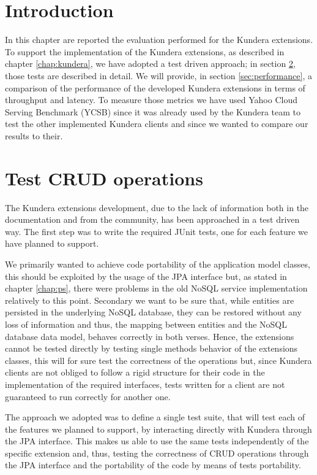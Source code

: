 \section{Introduction}
In this chapter are reported the evaluation performed for the Kundera extensions.
To support the implementation of the Kundera extensions, as described in chapter \ref{chap:kundera}, we have adopted a test driven approach; in section \ref{sec:crud}, those tests are described in detail.
\noindent We will provide, in section \ref{sec:performance}, a comparison of the performance of the developed Kundera extensions in terms of throughput and latency. To measure those metrics we have used Yahoo Cloud Serving Benchmark (YCSB) \cite{paper:ycsb} since it was already used by the Kundera team to test the other implemented Kundera clients and since we wanted to compare our results to their.

\section{Test CRUD operations}
\label{sec:crud}
The Kundera extensions development, due to the lack of information both in the documentation and from the community, has been approached in a test driven way.
The first step was to write the required JUnit tests, one for each feature we have planned to support.

\newparagraph We primarily wanted to achieve code portability of the application model classes, this should be exploited by the usage of the JPA interface but, as stated in chapter \ref{chap:ps}, there were problems in the old NoSQL service implementation relatively to this point.
Secondary we want to be sure that, while entities are persisted in the underlying NoSQL database, they can be restored without any loss of information and thus, the mapping between entities and the NoSQL database data model, behaves correctly in both verses.
Hence, the extensions cannot be tested directly by testing single methods behavior of the extensions classes, this will for sure test the correctness of the operations but, since Kundera clients are not obliged to follow a rigid structure for their code in the implementation of the required interfaces, tests written for a client are not guaranteed to run correctly for another one. 

\noindent The approach we adopted was to define a single test suite, that will test each  of the features we planned to support, by interacting directly with Kundera through the JPA interface. This makes us able to use the same tests independently of the specific extension and, thus, testing the correctness of CRUD operations through the JPA interface and the portability of the code by means of tests portability.

